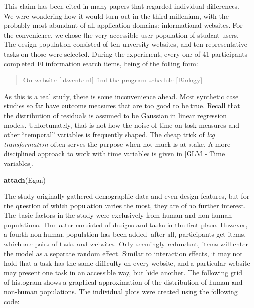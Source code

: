 \documentclass[]{svmono}
\newenvironment{Shaded}{\begin{snugshade}}{\end{snugshade}}
\newcommand{\KeywordTok}[1]{\textcolor[rgb]{0.13,0.29,0.53}{\textbf{#1}}}
\newcommand{\DataTypeTok}[1]{\textcolor[rgb]{0.13,0.29,0.53}{#1}}
\newcommand{\StringTok}[1]{\textcolor[rgb]{0.31,0.60,0.02}{#1}}
\newcommand{\OperatorTok}[1]{\textcolor[rgb]{0.81,0.36,0.00}{\textbf{#1}}}
\newcommand{\NormalTok}[1]{#1}
\begin{document}
This claim has been cited in many papers that regarded individual
differences. We were wondering how it would turn out in the third
millenium, with the probably most abundant of all application domains:
informational websites. For the convenience, we chose the very
accessible user population of student users. The design population
consisted of ten unversity websites, and ten representative tasks on
those were selected. During the experiment, every one of 41 participants
completed 10 information search items, being of the folling form:

\begin{quote}
On website {[}utwente.nl{]} find the program schedule {[}Biology{]}.
\end{quote}

As this is a real study, there is some inconvenience ahead. Most
synthetic case studies so far have outcome measures that are too good to
be true. Recall that the distribution of residuals is assumed to be
Gaussian in linear regression models. Unfortunately, that is not how the
noise of time-on-task measures and other ``temporal'' variables is
frequently shaped. The cheap trick of \emph{log transformation} often
serves the purpose when not much is at stake. A more disciplined
approach to work with time variables is given in {[}GLM - Time
variables{]}.

\begin{Shaded}
\begin{Highlighting}[]
\KeywordTok{attach}\NormalTok{(Egan)}
\end{Highlighting}
\end{Shaded}

\begin{Shaded}
\end{Shaded}

The study originally gathered demographic data and even design features,
but for the question of which population varies the most, they are of no
further interest. The basic factors in the study were exclusively from
human and non-human populations. The latter consisted of designs and
tasks in the first place. However, a fourth non-human population has
been added: after all, participants get items, which are pairs of tasks
and websites. Only seemingly redundant, items will enter the model as a
separate random effect. Similar to interaction effects, it may not hold
that a task has the same difficulty on every website, and a particular
website may present one task in an accessible way, but hide another. The
following grid of histogram shows a graphical approximation of the
distribution of human and non-human populations. The individual plots
were created using the following code:
\end{document}
